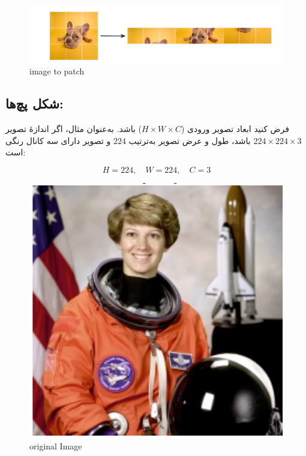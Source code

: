 \begin{figure}[h]
	\centering
	\begin{minipage}[b]{0.9\textwidth}
		\centering
		\includegraphics[width=\textwidth]{transformer_images/image_patch_embedding.png}
		\caption{image to patch}
		\label{fig:image to patch in vision transformer}
	\end{minipage}
	\hfill
\end{figure}

\subsection{شکل پچ‌ها:}
فرض کنید ابعاد تصویر ورودی (\(H \times W \times C\)) باشد. به‌عنوان مثال، اگر اندازهٔ تصویر \(224 \times 224 \times 3\) باشد، طول و عرض تصویر به‌ترتیب \(224\) و تصویر دارای سه کانال رنگی است:

\[
H = 224, \quad W = 224, \quad C = 3
\]

\begin{figure}[h]
	\centering
	\begin{minipage}[b]{0.9\textwidth}
		\centering
		\includegraphics[width=\textwidth]{transformer_images/space_original_image.png}
		\caption{original Image}
		\label{fig:Original Image}
	\end{minipage}
	\hfill
\end{figure}

